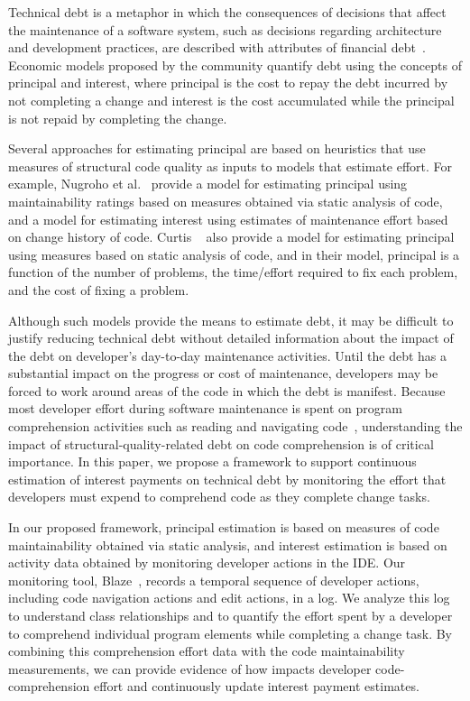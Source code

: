 Technical debt is a metaphor in which the consequences of decisions that affect the maintenance of a software system, such as decisions regarding architecture and development practices, are described with attributes of financial debt~\cite{Cunningham:1992}. Economic models proposed by the \TD community quantify debt using the concepts of principal and interest, where principal is the cost to repay the debt incurred by not completing a change and interest is the cost accumulated while the principal is not repaid by completing the change.

Several approaches for estimating principal are based on heuristics that use measures of structural code quality as inputs to models that estimate effort. For example, Nugroho et al.~\cite{Nugroho_etal:2011} provide a model for estimating principal using maintainability ratings based on measures obtained via static analysis of code, and a model for estimating interest using estimates of maintenance effort based on change history of code. Curtis \etal~\cite{Curtis_etal:2012} also provide a model for estimating principal using measures based on static analysis of code, and in their model, principal is a function of the number of problems, the time/effort required to fix each problem, and the cost of fixing a problem.  

Although such models provide the means to estimate debt, it may be difficult to justify reducing technical debt without detailed information about the impact of the debt on developer's day-to-day maintenance activities. Until the debt has a substantial impact on the progress or cost of maintenance, developers may be forced to work around areas of the code in which the debt is manifest. Because most developer effort during software maintenance is spent on program comprehension activities such as reading and navigating code~\cite{Fjeldstad_Hamlen:1982,Standish:1984,vonMayrhauser_etal:1997,Ko_etal:2006,LaToza_etal:2006,Tiarks:2011}, understanding the impact of structural-quality-related debt on code comprehension is of critical importance. In this paper, we propose a framework to support continuous estimation of interest payments on technical debt by monitoring the effort that developers must expend to comprehend code as they complete change tasks. 

In our proposed framework, principal estimation is based on measures of code maintainability obtained via static analysis, and interest estimation is based on activity data obtained by monitoring developer actions in the IDE. Our monitoring tool, Blaze~\cite{Snipes_etal:2014}, records a temporal sequence of developer actions, including code navigation actions and edit actions, in a log. We analyze this log to understand class relationships and to quantify the effort spent by a developer to comprehend individual program elements while completing a change task. By combining this comprehension effort data with the code maintainability measurements, we can provide evidence of how \TD impacts developer code-comprehension effort and continuously update interest payment estimates.

